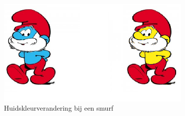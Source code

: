 	\begin{figure}[H]
		\centering
		\includegraphics[width=0.85\textwidth]{Introduction/resultaat_smurf_2.png}
		\caption{Huidskleurverandering bij een smurf}
		\label{fig:smurf}
	\end{figure}


